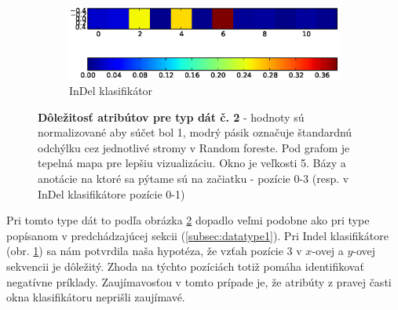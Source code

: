 \begin{figure}[htp]
\begin{subfigure}[t]{0.4\textwidth}
                \includegraphics[width=\textwidth]{images/clf_fi/randomforest_cmp_5_indel_heatmap}
                \caption{InDel klasifikátor}
                \label{fig:datatype2-i}
        \end{subfigure}
        \caption[Dôležitosť atribútov pre typ dát č. 2]{
        \textbf{Dôležitosť atribútov pre typ dát č. 2} - hodnoty sú normalizované aby súčet bol 1, modrý pásik označuje štandardnú odchýlku cez jednotlivé stromy v Random foreste.
        Pod grafom je tepelná mapa pre lepšiu vizualizáciu. Okno je veľkosti 5. Bázy a anotácie na ktoré sa pýtame sú na začiatku - pozície 0-3 (resp. v InDel klasifikátore pozície 0-1)
        }
        \label{fig:datatype2}
\end{figure}


Pri tomto type dát to podľa obrázka \ref{fig:datatype2} dopadlo veľmi podobne ako pri type popísanom v predchádzajúcej sekcii (\ref{subsec:datatype1}).
Pri Indel klasifikátore (obr. \ref{fig:datatype2-i}) sa nám potvrdila naša hypotéza, že vzťah pozície 3 v $x$-ovej a $y$-ovej sekvencii je dôležitý.
Zhoda na týchto pozíciách totiž pomáha identifikovať negatívne príklady.
Zaujímavosťou v tomto prípade je, že atribúty z pravej časti okna klasifikátoru neprišli zaujímavé.

